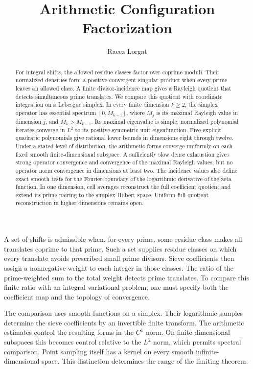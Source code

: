 \documentclass[11pt]{article}
\title{Arithmetic Configuration Factorization}
\author{Raeez Lorgat}
\date{}
\begin{document}
\maketitle

\begin{abstract}
For integral shifts, the allowed residue classes factor over coprime moduli.
Their normalized densities form a positive convergent singular product
when every prime leaves an allowed class.  A finite divisor-incidence map gives
a Rayleigh quotient that detects simultaneous prime translates.
We compare this quotient with coordinate integration on a Lebesgue simplex.
In every finite dimension $k\geq2$, the simplex operator has essential
spectrum $[0,M_{k-1}]$, where $M_j$ is its maximal Rayleigh value in
dimension $j$, and $M_k>M_{k-1}$.  Its maximal eigenvalue is simple;
normalized polynomial iterates converge in $L^2$ to its positive symmetric
unit eigenfunction.  Five explicit quadratic polynomials give rational
lower bounds in dimensions eight through twelve.
Under a stated level of distribution, the arithmetic forms converge
uniformly on each fixed smooth finite-dimensional subspace.
A sufficiently slow dense exhaustion gives strong operator convergence
and convergence of the maximal Rayleigh values, but no operator norm
convergence in dimensions at least two.
The incidence values also define exact smooth tests for the Fourier
boundary of the logarithmic derivative of the zeta function.
In one dimension, cell averages reconstruct the full coefficient quotient
and extend its prime pairing to the simplex Hilbert space.
Uniform full-quotient reconstruction in higher dimensions remains open.
\end{abstract}

A set of shifts is admissible when, for every prime, some residue class
makes all translates coprime to that prime.  Such a set supplies residue
classes on which every translate avoids prescribed small prime divisors.
Sieve coefficients then
assign a nonnegative weight to each integer in those classes.  The ratio of
the prime-weighted sum to the total weight detects prime translates.
To compare this finite ratio with an integral variational problem, one must
specify both the coefficient map and the topology of convergence.

The comparison uses smooth functions on a simplex.  Their logarithmic
samples determine the sieve coefficients by an invertible finite transform.
The arithmetic estimates control the resulting forms in the $C^1$ norm.
On finite-dimensional subspaces this becomes control relative to the
$L^2$ norm, which permits spectral comparison.  Point sampling itself has
a kernel on every smooth infinite-dimensional space.  This distinction
determines the range of the limiting theorem.
\end{document}
